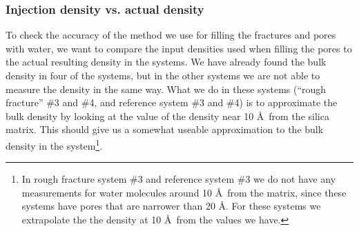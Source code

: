 \subsubsection*{Injection density vs. actual density}
To check the accuracy of the method we use for filling the fractures and pores with water, we want to compare the input densities used when filling the pores to the actual resulting density in the systems. We have already found the bulk density in four of the systems, but in the other systems we are not able to measure the density in the same way. What we do in these systems (``rough fracture'' \#3 and \#4, and reference system \#3 and \#4) is to approximate the bulk density by looking at the value of the density near 10 \AA\ from the silica matrix. This should give us a somewhat useable approximation to the bulk density in the system\footnote{In rough fracture system \#3 and reference system \#3 we do not have any measurements for water molecules around 10 \AA\ from the matrix, since these systems have pores that are narrower than 20 \AA. For these systems we extrapolate the the density at 10 \AA\ from the values we have.}.

